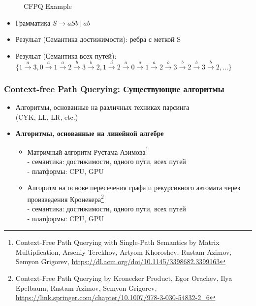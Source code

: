 \documentclass[xcolor=table,english]{beamer}
\begin{document}
\begin{frame}[fragile]
\begin{minipage}[m]{\linewidth}
\begin{figure}
            \caption{CFPQ Example}
        \end{figure}
    \end{minipage}\hfill
    \begin{minipage}[m]{\linewidth}
        \begin{itemize}
            \item Грамматика $S \rightarrow aSb~|~ab$
            \item Резульат (Семантика достижимости): ребра с меткой S
            \item Резульат (Семантика всех путей): $\{1 \xrightarrow{a} 3, 0 \xrightarrow{a} 1 \xrightarrow{a} 2 \xrightarrow{b} 3 \xrightarrow{b} 2, 1 \xrightarrow{a} 2 \xrightarrow{a} 0 \xrightarrow{a} 1 \xrightarrow{a} 2 \xrightarrow{b} 3 \xrightarrow{b} 2 \xrightarrow{b} 3 \xrightarrow{b} 2, ...\}$
        \end{itemize}
    \end{minipage}
\end{frame}

\begin{frame}[fragile] \frametitle{Context-free Path Querying: Существующие алгоритмы}
    \begin{itemize}
        \item Алгоритмы, основанные на различных техниках парсинга\\(CYK, LL, LR, etc.)
        \item \textbf{Алгоритмы, основанные на линейной алгебре}
        {
            \begin{itemize}
                \item Матричный алгоритм Рустама Азимова\footnote{Context-Free Path Querying with Single-Path Semantics by Matrix Multiplication, Arseniy Terekhov, Artyom  Khoroshev, Rustam  Azimov, Semyon Grigorev, \href{https://dl.acm.org/doi/10.1145/3398682.3399163}{https://dl.acm.org/doi/10.1145/3398682.3399163}}
                \\- семантика: достижимости, одного пути, всех путей
                \\- платформы: CPU, GPU
                \item Алгоритм на основе пересечения графа и рекурсивного автомата через произведения Кронекера\footnote{Context-Free Path Querying by Kronecker Product, Egor Orachev, Ilya Epelbaum, Rustam  Azimov, Semyon Grigorev, \href{https://link.springer.com/chapter/10.1007/978-3-030-54832-2\_6}{https://link.springer.com/chapter/10.1007/978-3-030-54832-2\_6}}
                \\- семантика: достижимости, одного пути, всех путей
                \\- платформы: CPU, GPU
            \end{itemize}
        }
    \end{itemize}
\end{frame}
\end{document}
